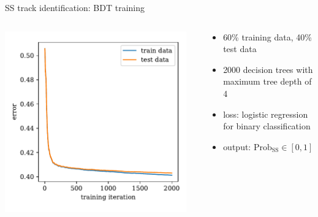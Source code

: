 \documentclass[aspectratio=1610, 10pt]{beamer}
\begin{document}
\begin{frame}{SS track identification: BDT training}
  \begin{columns}
    \begin{column}{0.4\textwidth}
      \centering
      \includegraphics[width=0.95\textwidth]{images/SS_history_error.pdf}
    \end{column}
    \begin{column}{0.6\textwidth}
      \begin{itemize}
        \item 60\% training data, 40\% test data
        \item 2000 decision trees with maximum tree depth of 4
        \item loss: logistic regression for binary classification
        \item output: $\text{Prob}_\text{SS} \in [0,1]$
      \end{itemize}
    \end{column}
  \end{columns}
\end{frame}
\end{document}
